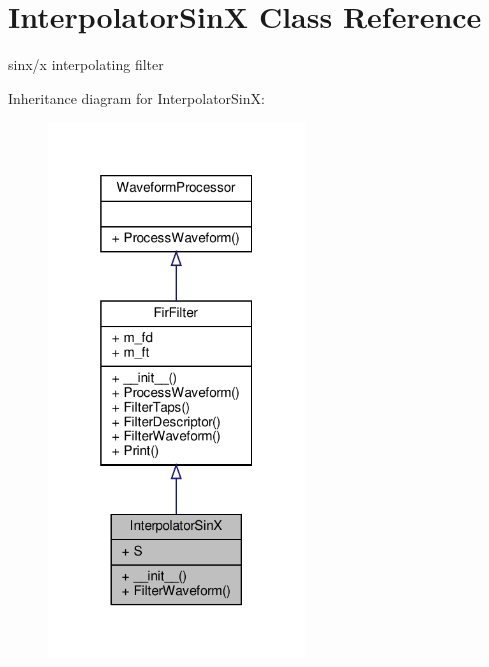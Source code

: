 \hypertarget{classSignalIntegrity_1_1TimeDomain_1_1Filters_1_1InterpolatorSinX_1_1InterpolatorSinX}{}\section{Interpolator\+SinX Class Reference}
\label{classSignalIntegrity_1_1TimeDomain_1_1Filters_1_1InterpolatorSinX_1_1InterpolatorSinX}


sinx/x interpolating filter  




Inheritance diagram for Interpolator\+SinX\+:\nopagebreak
\begin{figure}[H]
\begin{center}
\leavevmode
\includegraphics[width=193pt]{classSignalIntegrity_1_1TimeDomain_1_1Filters_1_1InterpolatorSinX_1_1InterpolatorSinX__inherit__graph}
\end{center}
\end{figure}



